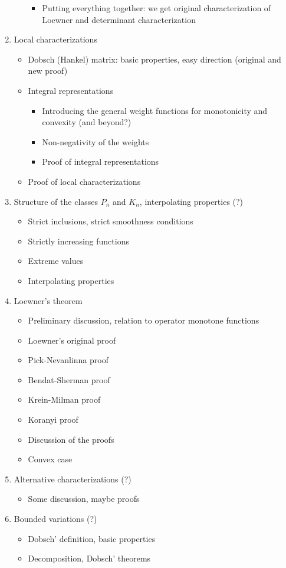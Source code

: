 \begin{enumerate}
\begin{itemize}
				\begin{itemize}
					\item Putting everything together: we get original characterization of Loewner and determinant characterization
				\end{itemize}
		\end{itemize}
	\item Local characterizations
		\begin{itemize}
			\item Dobsch (Hankel) matrix: basic properties, easy direction (original and new proof)
			\item Integral representations
				\begin{itemize}
					\item Introducing the general weight functions for monotonicity and convexity (and beyond?)
					\item Non-negativity of the weights
					\item Proof of integral representations
				\end{itemize}
			\item Proof of local characterizations
		\end{itemize}
	\item Structure of the classes $P_{n}$ and $K_{n}$, interpolating properties (?)
		\begin{itemize}
			\item Strict inclusions, strict smoothness conditions
			\item Strictly increasing functions
			\item Extreme values
			\item Interpolating properties
		\end{itemize}
	\item Loewner's theorem
		\begin{itemize}
			\item Preliminary discussion, relation to operator monotone functions
			\item Loewner's original proof
			\item Pick-Nevanlinna proof
			\item Bendat-Sherman proof
			\item Krein-Milman proof
			\item Koranyi proof
			\item Discussion of the proofs
			\item Convex case
		\end{itemize}
	\item Alternative characterizations (?)
		\begin{itemize}
			\item Some discussion, maybe proofs
		\end{itemize}
	\item Bounded variations (?)
		\begin{itemize}
			\item Dobsch' definition, basic properties
			\item Decomposition, Dobsch' theorems
		\end{itemize}
\end{enumerate}

